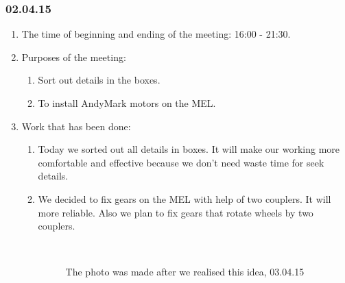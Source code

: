 \subsubsection{02.04.15}
\begin{enumerate}
	
	\item The time of beginning and ending of the meeting: 16:00 - 21:30.
	
	\item Purposes of the meeting: 
	\begin{enumerate}
		
		\item Sort out details in the boxes.
		
		\item To install AndyMark motors on the MEL.

	\end{enumerate}

	\item Work that has been done:
	\begin{enumerate}
		
		\item Today we sorted out all details in boxes. It will make our working more comfortable and effective because we don't need waste time for seek details.
		
		\item We decided to fix gears on the MEL with help of two couplers. It will more reliable. Also we plan to fix gears that rotate wheels by two couplers.
		\begin{figure}[H]
			\begin{minipage}[h]{0.2\linewidth}
				\center  
			\end{minipage}
			\begin{minipage}[h]{0.6\linewidth}
				\caption{The photo was made after we realised this idea, 03.04.15}
			\end{minipage}
		\end{figure}
		

\end{enumerate}
\end{enumerate}
